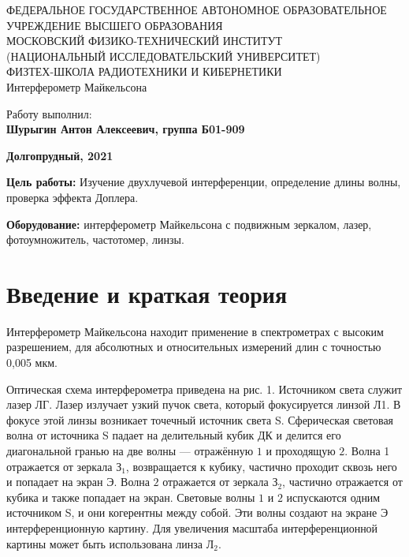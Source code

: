 \documentclass[15pt,a5paper,reqno]{article}
\begin{document}
\begin{center}
  {\small ФЕДЕРАЛЬНОЕ ГОСУДАРСТВЕННОЕ АВТОНОМНОЕ ОБРАЗОВАТЕЛЬНОЕ\\ УЧРЕЖДЕНИЕ ВЫСШЕГО ОБРАЗОВАНИЯ\\ МОСКОВСКИЙ ФИЗИКО-ТЕХНИЧЕСКИЙ ИНСТИТУТ\\ (НАЦИОНАЛЬНЫЙ ИССЛЕДОВАТЕЛЬСКИЙ УНИВЕРСИТЕТ)\\ ФИЗТЕХ-ШКОЛА РАДИОТЕХНИКИ И КИБЕРНЕТИКИ}\\
  \hfill \break
  \hfill \break
  \hfill \break
  \Huge{Интерферометр Майкельсона}\\
\end{center}

\hfill \break
\hfill \break
\hfill \break
\hfill \break
\hfill \break
\hfill \break

\begin{flushright}
  \normalsize{Работу выполнил:}\\
  \normalsize{\textbf{Шурыгин Антон Алексеевич, группа Б01-909}}\\
\end{flushright}

\begin{center}
  \normalsize{\textbf{Долгопрудный, 2021}}
\end{center}


\thispagestyle{empty} %


\newpage
\thispagestyle{plain}
\tableofcontents
\thispagestyle{plain}
\newpage


\textbf{Цель работы:} Изучение двухлучевой интерференции, определение длины волны, проверка эффекта Доплера.

\textbf{Оборудование:} интерферометр Майкельсона с подвижным зеркалом, лазер, фотоумножитель, частотомер, линзы.

\section{Введение и краткая теория}

Интерферометр Майкельсона находит применение в спектрометрах с высоким разрешением, для абсолютных и относительных измерений длин с точностью 0,005 мкм. 

Оптическая схема интерферометра приведена на рис. 1. Источником света служит лазер $ЛГ$. Лазер излучает узкий пучок света, который фокусируется линзой Л1. В фокусе этой линзы возникает точечный
источник света S. Сферическая световая волна от источника S падает на делительный кубик ДК и делится его диагональной гранью на 
две волны — отражённую $1$ и проходящую $2$. Волна 1 отражается от
зеркала $З_1$, возвращается к кубику, частично проходит сквозь него и
попадает на экран $Э$. Волна $2$ отражается от зеркала $З_2$, частично отражается от кубика и также попадает на экран. Световые волны $1$ и $2$
испускаются одним источником S, и они когерентны между собой. Эти
волны создают на экране $Э$ интерференционную картину. Для увеличения масштаба интерференционной картины может быть использована
линза $Л_2$.
\end{document}
